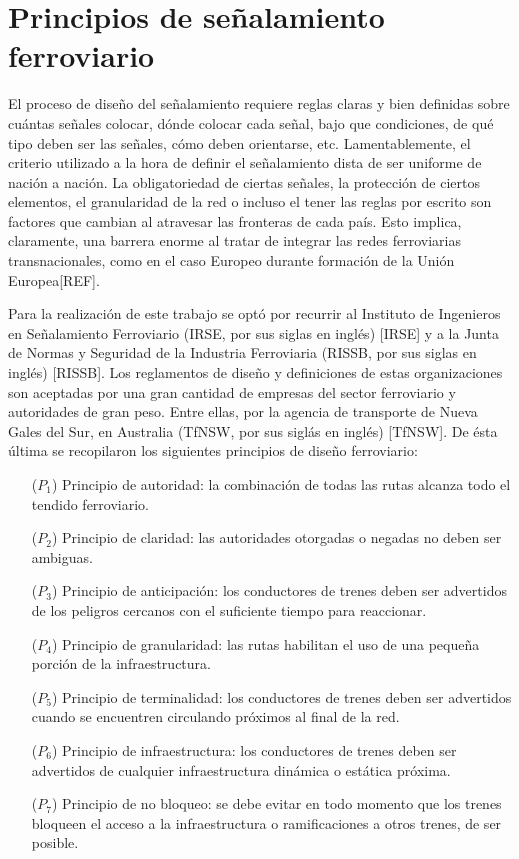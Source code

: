 \section{Principios de señalamiento ferroviario}
    \label{sec:principios}
    
    El proceso de diseño del señalamiento requiere reglas claras y bien definidas sobre cuántas señales colocar, dónde colocar cada señal, bajo que condiciones, de qué tipo deben ser las señales, cómo deben orientarse, etc. Lamentablemente, el criterio utilizado a la hora de definir el señalamiento dista de ser uniforme de nación a nación. La obligatoriedad de ciertas señales, la protección de ciertos elementos, el granularidad de la red o incluso el tener las reglas por escrito son factores que cambian al atravesar las fronteras de cada país. Esto implica, claramente, una barrera enorme al tratar de integrar las redes ferroviarias transnacionales, como en el caso Europeo durante formación de la Unión Europea[REF].
    
    Para la realización de este trabajo se optó por recurrir al Instituto de Ingenieros en Señalamiento Ferroviario (IRSE, por sus siglas en inglés) [IRSE] y a la Junta de Normas y Seguridad de la Industria Ferroviaria (RISSB, por sus siglas en inglés) [RISSB]. Los reglamentos de diseño y definiciones de estas organizaciones son aceptadas por una gran cantidad de empresas del sector ferroviario y autoridades de gran peso. Entre ellas, por la agencia de transporte de Nueva Gales del Sur, en Australia (TfNSW, por sus siglás en inglés) [TfNSW]. De ésta última se recopilaron los siguientes principios de diseño ferroviario:
    
    \begin{itemize}
        \item [($P_1$)] Principio de autoridad: la combinación de todas las rutas alcanza todo el tendido ferroviario.
        \item [($P_2$)] Principio de claridad: las autoridades otorgadas o negadas no deben ser ambiguas. 
        \item [($P_3$)] Principio de anticipación: los conductores de trenes deben ser advertidos de los peligros cercanos con el suficiente tiempo para reaccionar.
        \item [($P_4$)] Principio de granularidad: las rutas habilitan el uso de una pequeña porción de la infraestructura.
        \item [($P_5$)] Principio de terminalidad: los conductores de trenes deben ser advertidos cuando se encuentren circulando próximos al final de la red.
        \item [($P_6$)] Principio de infraestructura: los conductores de trenes deben ser advertidos de cualquier infraestructura dinámica o estática próxima.
        \item [($P_7$)] Principio de no bloqueo: se debe evitar en todo momento que los trenes bloqueen el acceso a la infraestructura o ramificaciones a otros trenes, de ser posible.
    \end{itemize}

